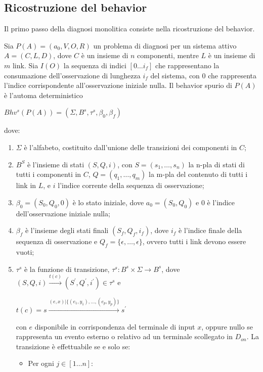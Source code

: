 \subsection{Ricostruzione del behavior}
Il primo passo della diagnosi monolitica consiste nella ricostruzione del behavior. 
\begin{defn}
Sia $P(A) = (a_0,V,O,R)$ un problema di diagnosi per un sistema attivo $A = (C,L,D)$, dove $C$ è un insieme di $n$ componenti, mentre $L$ è un insieme di $m$ link. Sia $I(O)$ la sequenza di indici $[0 \ldots i_f]$ che rappresentano la consumazione dell'osservazione di lunghezza $i_f$ del sistema, con $0$ che rappresenta l'indice corrispondente all'osservazione iniziale nulla. Il behavior spurio di $P(A)$ è l'automa deterministico
\begin{center}
	$Bhv^s(P(A)) = (\Sigma,B^s,\tau^s,\beta_0,\beta_f)$
\end{center}
dove:
\begin{enumerate}
\item $\Sigma$ è l'alfabeto, costituito dall'unione delle transizioni dei componenti in $C$;
\item $B^S$ è l'insieme di stati $(S,Q,i)$, con $S = (s_1,\ldots,s_n)$ la n-pla di stati di tutti i componenti in $C$, $Q = (q_1,\ldots,q_m)$ la m-pla del contenuto di tutti i link in $L$, e $i$ l'indice corrente della sequenza di osservazione;
\item $\beta_0 = (S_0,Q_0,0)$ è lo stato iniziale, dove $a_0 = (S_0,Q_0)$ e $0$ è l'indice dell'osservazione iniziale nulla;
\item $\beta_f$ è l'insieme degli stati finali $(S_f,Q_f,i_f)$, dove $i_f$ è l'indice finale della sequenza di osservazione e $Q_f = \{\epsilon, \ldots, \epsilon\}$, ovvero tutti i link devono essere vuoti;
\item $\tau^s$ è la funzione di transizione, $\tau^s: B^s \times \Sigma \rightarrow B^s$, dove $(S,Q,i) \xrightarrow{t(c)} (S^\prime,Q^\prime,i^\prime) \in \tau^s$ e 
\begin{center}
	$t(c) = s \xrightarrow{(e,x) | \{(e_1,y_1), \ldots, (e_p,y_p)\}} s^\prime$
\end{center}
con $e$ disponibile in corrispondenza del terminale di input $x$, oppure nullo se rappresenta un evento esterno o relativo ad un terminale scollegato in $D_{on}$. La transizione è effettuabile se e solo se:
\begin{itemize}
\item Per ogni $j \in [1 \ldots n]$:
\begin{center}

\end{center}
\end{itemize}
\end{enumerate}
\end{defn}
